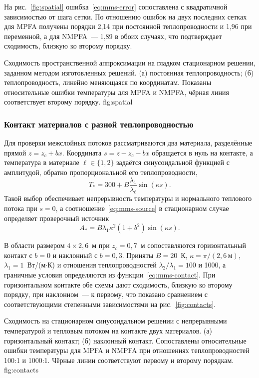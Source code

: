 На рис.~\ref{fig:spatial} ошибка~\eqref{eq:mms-error} сопоставлена с квадратичной зависимостью от шага сетки. По отношению ошибок на двух последних сетках для MPFA получены порядки 2,14 при постоянной теплопроводности и 1,96 при переменной, а для NMPFA~--- 1,89 в обоих случаях, что подтверждает сходимость, близкую ко второму порядку.

 {Сходимость пространственной аппроксимации на гладком стационарном решении, заданном методом изготовленных решений. (а) постоянная теплопроводность; (б) теплопроводность, линейно меняющаяся по координатам. Показаны относительные ошибки температуры для MPFA и NMPFA, чёрная линия соответствует второму порядку.} {fig:spatial}

\subsubsection{Контакт материалов с разной теплопроводностью}

Для проверки межслойных потоков рассматриваются два материала, разделённые прямой $z=z_c+bx$. Координата $s=z-z_c-bx$ обращается в нуль на контакте, а температура в материале $\ell\in\{1,2\}$ задаётся синусоидальной функцией с амплитудой, обратно пропорциональной его теплопроводности,
\begin{equation}
 T_* = 300 + B\frac{\lambda_1}{\lambda_\ell}\sin(\kappa s).
 \label{eq:mms-contact}
\end{equation}
Такой выбор обеспечивает непрерывность температуры и нормального теплового потока при $s=0$, а соотношение~\eqref{eq:mms-source} в стационарном случае определяет проверочный источник
\begin{equation}
 A_* = B\lambda_1\kappa^2(1 + b^2)\sin(\kappa s).
\end{equation}

В области размером $4\times2{,}6$~м при $z_c=0{,}7$~м сопоставляются горизонтальный контакт с $b=0$ и наклонный с $b=0{,}3$. Приняты $B=20$~К, $\kappa=\pi/(2{,}6\,\text{м})$, $\lambda_1=1$~Вт/(м$\cdot$К) и отношения теплопроводностей $\lambda_2/\lambda_1=100$ и 1000, а граничные условия определяются из функции~\eqref{eq:mms-contact}. При горизонтальном контакте обе схемы дают сходимость, близкую ко второму порядку, при наклонном~--- к первому, что показано сравнением с соответствующими степенными зависимостями на рис.~\ref{fig:contacts}.

 {Сходимость на стационарном синусоидальном решении с непрерывными температурой и тепловым потоком на контакте двух материалов. (а) горизонтальный контакт; (б) наклонный контакт. Сопоставлены относительные ошибки температуры для MPFA и NMPFA при отношениях теплопроводностей 100:1 и 1000:1. Чёрные линии соответствуют первому и второму порядкам.} {fig:contacts}

